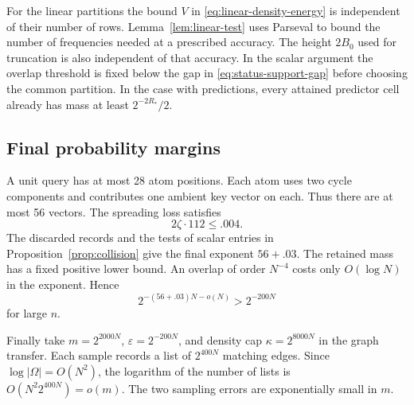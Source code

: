 For the linear partitions the bound \(V\) in
\eqref{eq:linear-density-energy} is independent of their number of rows.
Lemma~\ref{lem:linear-test} uses Parseval to bound the number of
frequencies needed at a prescribed accuracy. The height \(2B_0\) used
for truncation is also independent of that accuracy. In the scalar
argument the overlap threshold is fixed below the gap in
\eqref{eq:status-support-gap} before choosing the common partition.
In the case with predictions, every attained predictor cell already
has mass at least \(2^{-2R_*}/2\).

\subsection{Final probability margins}

A unit query has at most 28 atom positions. Each atom uses two cycle
components and contributes one ambient key vector on each. Thus there
are at most 56 vectors. The spreading loss satisfies
\[
 2\zeta\cdot112\le .004.
\]
The discarded records and the tests of scalar entries in
Proposition~\ref{prop:collision} give the final exponent \(56+.03\). The retained mass has a fixed positive lower
bound. An overlap of order \(N^{-4}\) costs only \(O(\log N)\) in the
exponent. Hence
\[
 2^{-(56+.03)N-o(N)}>2^{-200N}
\]
for large \(n\).

Finally take \(m=2^{2000N}\), \(\varepsilon=2^{-200N}\), and density
cap \(\kappa=2^{8000N}\) in the graph transfer. Each sample records a list of
\(2^{400N}\) matching edges. Since \(\log|\Omega|=O(N^2)\), the logarithm of the
number of lists is \(O(N^2 2^{400N})=o(m)\).
The two sampling errors are exponentially small in \(m\).
